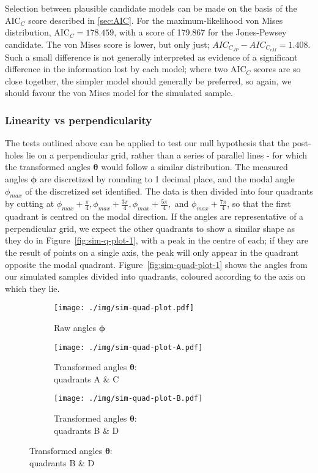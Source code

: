 \documentclass[../../ArchStats.tex]{subfiles}
\begin{document}
Selection between plausible candidate models can be made on the basis of the AIC$_C$ score described in \ref{sec:AIC}. For the maximum-likelihood von Mises distribution, AIC$_C = 178.459$, with a score of 179.867 for the Jones-Pewsey candidate. The von Mises score is lower, but only just; $AIC_{C_{JP}} - AIC_{C_{vM}}  = 1.408$. Such a small difference is not generally interpreted as evidence of a significant difference in the information lost by each model; where two AIC$_C$ scores are so close together, the simpler model should generally be preferred, so again, we should favour the von Mises model for the simulated sample.


\subsubsection{Linearity vs perpendicularity}
\label{sssec:perpendicularity}
The tests outlined above can be applied to test our null hypothesis that the post-holes lie on a perpendicular grid, rather than a series of parallel lines - for which the transformed angles $\boldsymbol{\theta}$ would follow a similar distribution. The measured angles $\boldsymbol{\phi}$ are discretized by rounding to 1 decimal place, and the modal angle $\phi_{max}$ of the discretized set identified. The data is then divided into four quadrants by cutting at $\phi_{max} + \frac{\pi}{4}, \phi_{max} + \frac{3\pi}{4}, \phi_{max} + \frac{5\pi}{4},$ and $\phi_{max} + \frac{7\pi}{4}$, so that the first quadrant is centred on the modal direction. If the angles are representative of a perpendicular grid, we expect the other quadrants to show a similar shape as they do in Figure~\ref{fig:sim-q-plot-1}, with a peak in the centre of each; if they are the result of points on a single axis, the peak will only appear in the quadrant opposite the modal quadrant. Figure~\ref{fig:sim-quad-plot-1} shows the angles from our simulated samples divided into quadrants, coloured according to the axis on which they lie.

\begin{figure}[!h]
\centering
\caption{Raw angles from Figure \ref{fig:sim-plot-1} divided into quadrants, and plots of transformed angles of each pair of opposed quadrants}
\label{fig:sim-quad-plot-1}
\begin{subfigure}[t]{0.3\textwidth}
\centering
\caption{Raw angles $\boldsymbol{\phi}$}
\texttt{[image: ./img/sim-quad-plot.pdf]}
\end{subfigure}
\begin{subfigure}[t]{0.3\textwidth}
\centering
\caption{Transformed angles $\boldsymbol{\theta}$:\\ quadrants A \& C}
\texttt{[image: ./img/sim-quad-plot-A.pdf]}
\end{subfigure}
\begin{subfigure}[t]{0.3\textwidth}
\centering
\caption{Transformed angles $\boldsymbol{\theta}$:\\ quadrants B \& D}
\texttt{[image: ./img/sim-quad-plot-B.pdf]}
\end{subfigure}
\end{figure}
\end{document}

